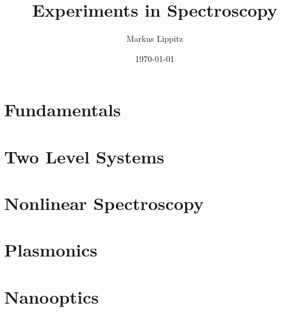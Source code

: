 \documentclass[notoc,nofonts,a4paper,twoside,nobib]{tufte-book}
\renewcommand{\chaptername}{Chapter\ }
\begin{document}
  \tikzexternaldisable


\title{Experiments in Spectroscopy}

\author{Markus Lippitz}
\date{\today}


\maketitle


%
\tableofcontents

%

%
\part{Fundamentals}






%
\part{Two Level Systems}





\part{Nonlinear Spectroscopy}






\part{Plasmonics}







\part{Nanooptics}




%
\renewcommand{\chaptername}{Appendix\ }

\appendix
\appendixpage

%
%




\printbibliography
\end{document}
